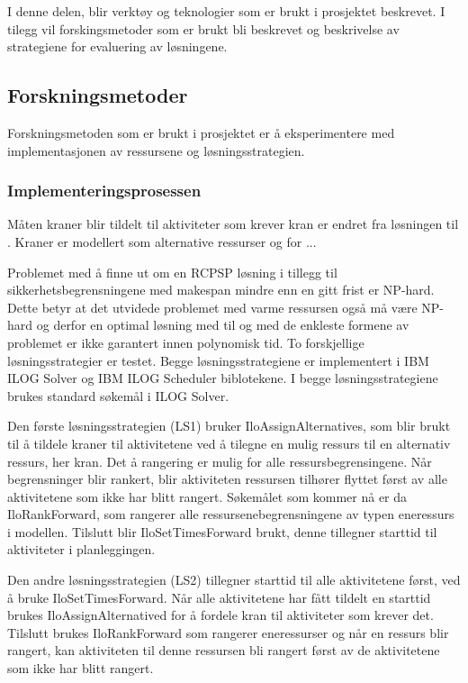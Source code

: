 I denne delen, blir verktøy og teknologier som er brukt i prosjektet beskrevet. I tilegg vil forskingsmetoder som er brukt bli beskrevet og beskrivelse av strategiene for evaluering av løsningene.

\subsection{Forskningsmetoder}
Forskningsmetoden som er brukt i prosjektet er å eksperimentere med implementasjonen av ressursene og løsningsstrategien.

\subsubsection{Implementeringsprosessen}
Måten kraner blir tildelt til aktiviteter som krever kran er endret fra løsningen til \bht. Kraner er modellert som alternative ressurser og for ...

Problemet med å finne ut om en RCPSP løsning i tillegg til sikkerhetsbegrensningene med makespan mindre enn en gitt frist er NP-hard. Dette betyr at det utvidede problemet med varme ressursen også må være NP-hard og derfor en optimal løsning med til og med de enkleste formene av problemet er ikke garantert innen polynomisk tid. To forskjellige løsningsstrategier er testet. Begge løsningsstrategiene er implementert i IBM ILOG Solver og IBM ILOG Scheduler biblotekene. I begge løsningsstrategiene brukes standard søkemål i ILOG Solver.

Den første løsningsstrategien (LS1) bruker IloAssignAlternatives, som blir brukt til å tildele kraner til aktivitetene ved å tilegne en mulig ressurs til en alternativ ressurs, her kran. Det å rangering er mulig for alle ressursbegrensingene. Når begrensninger blir rankert, blir aktiviteten ressursen tilhører flyttet først av alle aktivitetene som ikke har blitt rangert. Søkemålet som kommer nå er da IloRankForward, som rangerer alle ressursenebegrensningene av typen eneressurs i modellen. Tilslutt blir IloSetTimesForward brukt, denne tillegner starttid til aktiviteter i planleggingen.

Den andre løsningsstrategien (LS2) tillegner starttid til alle aktivitetene først, ved å bruke IloSetTimesForward. Når alle aktivitetene har fått tildelt en starttid brukes IloAssignAlternatived for å fordele kran til aktiviteter som krever det. Tilslutt brukes IloRankForward som rangerer eneressurser og når en ressurs blir rangert, kan aktiviteten til denne ressursen bli rangert først av de aktivitetene som ikke har blitt rangert.


